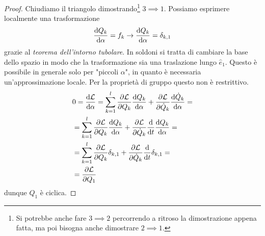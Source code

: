 \begin{proof}
   Chiudiamo il triangolo dimostrando\footnote{Si potrebbe anche fare $3\implies 2$ percorrendo a ritroso la dimostrazione appena fatta, ma poi bisogna anche dimostrare $2\implies 1.$} $3\implies1$. Possiamo esprimere localmente una trasformazione
   \begin{equation}
   \frac{\mathrm{d} Q_k}{\mathrm{d} \alpha} = f_k \to\frac{\mathrm{d} Q_k}{\mathrm{d} \alpha}=\delta_{k,1}
   \end{equation}
   grazie al \emph{teorema dell'intorno tubolare}. In soldoni si tratta di cambiare la base dello spazio in modo che la trasformazione sia una traslazione lungo $\hat{e}_1$. Questo è possibile in generale solo per "piccoli $\alpha$", in quanto è necessaria un'approssimazione locale. Per la proprietà di gruppo questo non è restrittivo. 
   \begin{equation}
   \begin{aligned}
       &0=\frac{\mathrm{d} \mathcal{L}}{\mathrm{d} \alpha} = \sum_{k=1}^l \frac{\partial \mathcal{L}}{\partial Q_k}\frac{\mathrm{d} Q_k}{\mathrm{d} \alpha} + \frac{\partial \mathcal{L}}{\partial \dot{Q}_k}\frac{\mathrm{d} \dot{Q}_k}{\mathrm{d} \alpha}=\\
       &=\sum_{k=1}^l \frac{\partial \mathcal{L}}{\partial Q_k}\frac{\mathrm{d} Q_k}{\mathrm{d} \alpha} + \frac{\partial \mathcal{L}}{\partial \dot{Q}_k}\frac{\mathrm{d}}{\mathrm{d}t}\frac{\mathrm{d} Q_k}{\mathrm{d} \alpha}=\\
       &=\sum_{k=1}^l \frac{\partial \mathcal{L}}{\partial Q_k}\delta_{k,1} + \frac{\partial \mathcal{L}}{\partial \dot{Q}_k}\frac{\mathrm{d}}{\mathrm{d}t} \delta_{k,1}=\\
       &=\frac{\partial \mathcal{L}}{\partial Q_1}
    \end{aligned}
   \end{equation}
   dunque $Q_1$ è ciclica.
   \end{proof}
  

